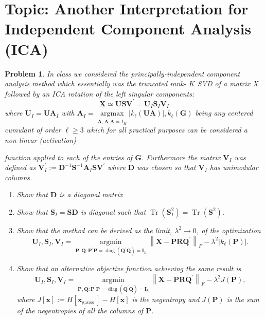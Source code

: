 \documentclass[11pt]{article}
\theoremstyle{plain} %
\newtheorem{problem}[theorem]{Problem}
\theoremstyle{remark}
\begin{document}
\section*{Topic: Another Interpretation for Independent Component Analysis (ICA)}
\begin{problem}
In class we considered the principally-independent component analysis method
which essentially was the truncated rank- $K$ SVD of a matrix X followed by an ICA rotation of the left singular components:
$$
  \mathbf{X} \simeq \mathbf{U S V}^{\prime}=\mathbf{U}_I \mathbf{S}_I \mathbf{V}_I
$$
where $\mathbf{U}_I=\mathbf{U} \mathbf{A}_I$ with $\mathbf{A}_I=\underset{\mathbf{A}, \mathbf{A}^{\prime} \mathbf{A}=I_K}{\operatorname{argmax}}\left|k_{\ell}(\mathbf{U A})\right|, k_{\ell}(\mathbf{G})$ being any centered cumulant of order $\ell \geq 3$ which for all practical purposes can be considered a non-linear (activation)

function applied to each of the entries of $\mathbf{G}$. Furthermore the matrix $\mathbf{V}_I$ was defined as $\mathbf{V}_I^{\prime}:=\mathbf{D}^{-1} \mathbf{S}^{-1} \mathbf{A}_I \mathbf{S} \mathbf{V}^{\prime}$ where $\mathbf{D}$ was chosen so that $\mathbf{V}_I$ has unimodular columns.
\begin{enumerate}[label=(\alph*)]
  \item Show that $\mathbf{D}$ is a diagonal matrix
  \item Show that $\mathbf{S}_I=\mathbf{S D}$ is diagonal such that $\operatorname{Tr}\left(\mathbf{S}_I^2\right)=\operatorname{Tr}\left(\mathbf{S}^2\right)$.
  \item Show that the method can be derived as the limit, $\lambda^2 \rightarrow 0$, of the optimization
        $$
          \mathbf{U}_I, \mathbf{S}_I, \mathbf{V}_I=\underset{\mathbf{P}, \mathbf{Q}: \mathbf{P}^{\prime} \mathbf{P}=\operatorname{diag}\left(\mathbf{Q}^{\prime} \mathbf{Q}\right)=\mathbf{I}_k}{\operatorname{argmin}}\left\|\mathbf{X}-\mathbf{P R Q}^{\prime}\right\|_F-\lambda^2\left|k_{\ell}(\mathbf{P})\right| .
        $$
  \item Show that an alternative objective function achieving the same result is
        $$
          \mathbf{U}_I, \mathbf{S}_I, \mathbf{V}_I=\underset{\mathbf{P}, \mathbf{Q}: \mathbf{P}^{\prime} \mathbf{P}=\operatorname{diag}\left(\mathbf{Q}^{\prime} \mathbf{Q}\right)=\mathbf{I}_k}{\operatorname{argmin}}\left\|\mathbf{X}-\mathbf{P R Q}^{\prime}\right\|_F-\lambda^2 J(\mathbf{P}),
        $$
        where $J[\mathbf{x}]:=H\left[\mathbf{x}_{\text {gauss }}\right]-H[\mathbf{x}]$ is the negentropy and $J(\mathbf{P})$ is the sum of the negentropies of all the columns of $\mathbf{P}$.
\end{enumerate}
\end{problem}
\end{document}
